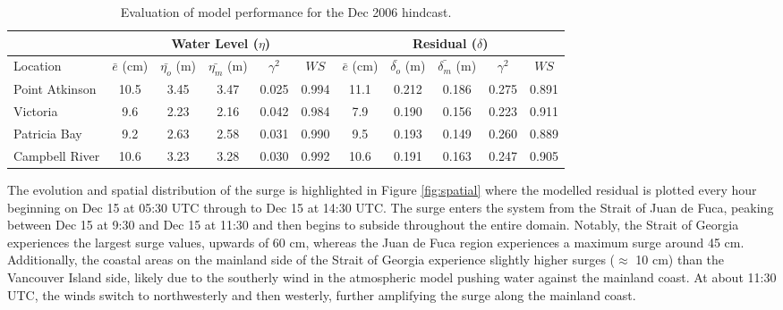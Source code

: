 \documentclass[pdftex,10pt]{article}
\begin{document}
\begin{table}[h]
\centering 
\begin{tabular}{|l |c c c c c | c c c c c|} 
\hline 
& \multicolumn{5}{|c|}{Water Level ($\eta$)}        & \multicolumn{5}{|c|}{Residual ($\delta$)} \\ 
\hline 
Location       & $\bar{e}$ (cm) & $\bar{\eta_{o}}$ (m) & $\bar{\eta_{m}}$ (m) & $\gamma^2$ & $WS$   & $\bar{e}$ (cm) & $\bar{\delta_{o}}$ (m) & $\bar{\delta_{m}}$ (m) & $\gamma^2$ & $WS$ \\
\hline 
Point Atkinson & 10.5           &  3.45                & 3.47                 &   0.025    & 0.994  & 11.1           &  0.212                 & 0.186                  &  0.275     & 0.891 \\
Victoria       &  9.6           &  2.23                & 2.16                 &   0.042    & 0.984  &  7.9           &  0.190                 & 0.156                  &  0.223     & 0.911 \\
Patricia Bay   &  9.2           &  2.63                & 2.58                 &   0.031    & 0.990  &  9.5           &  0.193                 & 0.149                  &  0.260     & 0.889 \\
Campbell River & 10.6           &  3.23                & 3.28                 &   0.030    & 0.992  & 10.6           &  0.191                 & 0.163                  &  0.247     & 0.905 \\
\hline 
\end{tabular}
\caption{Evaluation of model performance for the Dec 2006 hindcast.}
\label{tab:dec2006stat} 
\end{table}

The evolution and spatial distribution of the surge is highlighted in Figure \ref{fig:spatial} where the modelled residual is plotted every hour beginning on Dec 15 at 05:30 UTC through to Dec 15 at 14:30 UTC. The surge enters the system from the Strait of Juan de Fuca, peaking between Dec 15 at 9:30 and Dec 15 at 11:30 and then begins to subside throughout the entire domain. Notably, the Strait of Georgia experiences the largest surge values, upwards of 60 cm, whereas the Juan de Fuca region experiences a maximum surge around 45 cm. Additionally, the coastal areas on the mainland side of the Strait of Georgia experience slightly higher surges ($\approx$ 10 cm) than the Vancouver Island side, likely due to the southerly wind in the atmospheric model pushing water against the mainland coast. At about 11:30 UTC, the winds switch to northwesterly and then westerly, further amplifying the surge along the mainland coast. 
\end{document}

